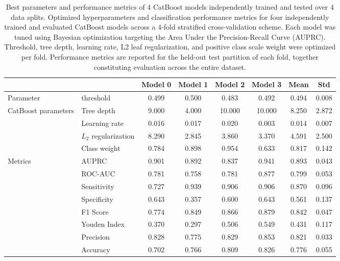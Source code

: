 \documentclass[pdflatex,sn-mathphys-num]{sn-jnl}%
\theoremstyle{thmstyleone}%
\theoremstyle{thmstyletwo}%
\theoremstyle{thmstylethree}%
\begin{document}
\begin{appendices}
\begin{table}[tbp]
    \centering
    \footnotesize
    \setlength{\tabcolsep}{4pt}
    \begin{tabular}{llcccccc}
        \toprule
        & & Model 0 & Model 1 & Model 2 & Model 3 & Mean & Std\\
        \midrule
        Parameter &  threshold & 0.499 & 0.500 & 0.483 & 0.492 & 0.494 & 0.008 \\
        \midrule
        CatBoost parameters & Tree depth & 9.000 & 4.000 & 10.000 & 10.000 & 8.250 & 2.872 \\
        & Learning rate & 0.016 & 0.017 & 0.020 & 0.003 & 0.014 & 0.007 \\
        & $L_2$ regularization & 8.290 & 2.845 & 3.860 & 3.370 & 4.591 & 2.500 \\
        & Class weight & 0.784 & 0.898 & 0.954 & 0.633 & 0.817 & 0.142 \\
        \midrule
        Metrics & AUPRC & 0.901 & 0.892 & 0.837 & 0.941 & 0.893 & 0.043 \\
        & ROC-AUC & 0.781 & 0.758 & 0.781 & 0.877 & 0.799 & 0.053 \\
        & Sensitivity & 0.727 & 0.939 & 0.906 & 0.906 & 0.870 & 0.096 \\
        & Specificity & 0.643 & 0.357 & 0.600 & 0.643 & 0.561 & 0.137 \\
        & F1 Score & 0.774 & 0.849 & 0.866 & 0.879 & 0.842 & 0.047 \\
        & Youden Index & 0.370 & 0.297 & 0.506 & 0.549 & 0.431 & 0.117 \\
        & Precision & 0.828 & 0.775 & 0.829 & 0.853 & 0.821 & 0.033 \\
        & Accuracy & 0.702 & 0.766 & 0.809 & 0.826 & 0.776 & 0.055 \\
        \bottomrule
    \end{tabular}
    \caption{Best parameters and performance metrics of 4 CatBoost models independently trained and tested over 4 data splits. Optimized hyperparameters and classification performance metrics for four independently trained and evaluated CatBoost models across a 4-fold stratified cross-validation scheme. Each model was tuned using Bayesian optimization targeting the Area Under the Precision-Recall Curve (AUPRC). Threshold, tree depth, learning rate, L2 leaf regularization, and positive class scale weight were optimized per fold. Performance metrics are reported for the held-out test partition of each fold, together constituting evaluation across the entire dataset.}
    \label{tab:catboost_metrics_firstrepeat}
\end{table}


\end{appendices}
\end{document}

